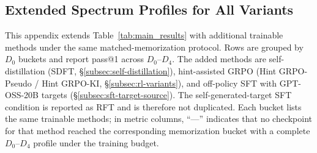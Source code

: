 \documentclass[]{bytedance_seed}
\theoremstyle{plain}
\theoremstyle{definition}
\theoremstyle{remark}
\begin{document}

\subsection{Extended Spectrum Profiles for All Variants}
\label{app:extended-spectrum}


This appendix extends Table~\ref{tab:main_results} with additional trainable methods under the same matched-memorization protocol. Rows are grouped by $D_0$ buckets and report pass@1 across $D_0$--$D_4$. The added methods are self-distillation (SDFT, \S\ref{subsec:self-distillation}), hint-assisted GRPO (Hint GRPO-Pseudo / Hint GRPO-KI, \S\ref{subsec:rl-variants}), and off-policy SFT with GPT-OSS-20B targets (\S\ref{subsec:sft-target-source}). The self-generated-target SFT condition is reported as RFT and is therefore not duplicated. Each bucket lists the same trainable methods; in metric columns, ``---'' indicates that no checkpoint for that method reached the corresponding memorization bucket with a complete $D_0$--$D_4$ profile under the training budget.
\end{document}
